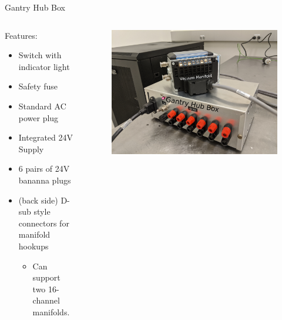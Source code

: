 \documentclass[english,aspectratio=43,8pt]{beamer}
\begin{document}
\begin{frame}{Gantry Hub Box}
  \begin{columns}
  \begin{column}{0.3\textwidth}
    {\large Features:}
    \begin{itemize}
      \item Switch with indicator light
      \item Safety fuse
      \item Standard AC power plug
      \item Integrated 24V Supply
      \item 6 pairs of 24V bananna plugs
      \item (back side) D-sub style connectors for manifold hookups
        \begin{itemize}
          \item Can support two 16-channel manifolds.
        \end{itemize}
    \end{itemize}
  \end{column}
  \begin{column}{0.7\textwidth}
    \begin{figure}
        \includegraphics[width=\textwidth]{figures/gantry_hub_action.jpg}
    \end{figure}
  \end{column}
  \end{columns}
\end{frame}
\end{document}
